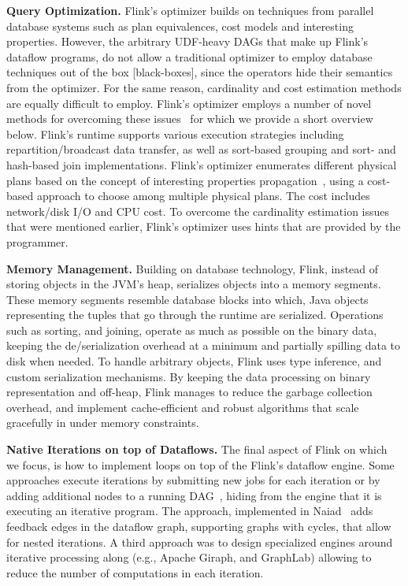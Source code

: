 \documentclass{sig-alternate}
\begin{document}
\textbf{Query Optimization.} Flink's optimizer builds on techniques from parallel database systems such as plan equivalences, cost models and interesting properties. However, the arbitrary UDF-heavy DAGs that make up Flink's dataflow programs, do not allow a traditional optimizer to employ database techniques out of the box [black-boxes], since the operators hide their semantics from the optimizer. For the same reason, cardinality and cost estimation methods are equally difficult to employ. Flink's optimizer employs a number of novel methods for overcoming these issues~\cite{blackBoxes, stratosphere, DBLP:journals/pvldb/EwenTKM12} for which we provide a short overview below. Flink's runtime supports various execution strategies including repartition/broadcast data transfer, as well as sort-based grouping and sort- and hash-based join implementations. Flink's optimizer enumerates different physical plans based on the concept of interesting properties propagation~\cite{scopeOptimizer}, using a cost-based approach to choose among multiple physical plans. The cost includes network/disk I/O and CPU cost. To overcome the cardinality estimation issues that were mentioned earlier, Flink's optimizer uses hints that are provided by the programmer.

\textbf{Memory Management.} Building on database technology, Flink, instead of storing objects in the JVM's heap, serializes objects into a  memory segments. These memory segments resemble database blocks into which, Java objects representing the tuples that go through the runtime are serialized. Operations such as sorting, and joining, operate as much as possible on the binary data, keeping the de/serialization overhead at a minimum and partially spilling data to disk when needed. To handle arbitrary objects, Flink uses type inference, and  custom serialization mechanisms.  By keeping the data processing on binary representation and off-heap, Flink manages to reduce the garbage collection overhead, and implement cache-efficient and robust algorithms that scale gracefully in under memory constraints.

\textbf{Native Iterations on top of Dataflows.} The final aspect of Flink on which we focus, is how to implement loops on top of the Flink's dataflow engine. Some approaches execute iterations by submitting new jobs for each iteration or by adding additional nodes to a running DAG~\cite{DBLP:journals/pvldb/BuHBE10, DBLP:conf/hotcloud/ZahariaCFSS10}, hiding from  the engine that it is executing an iterative program. The approach, implemented in Naiad~\cite{murray2013naiad} adds feedback edges in the dataflow graph, supporting graphs with cycles, that  allow for nested iterations. A third approach was to design specialized engines around iterative processing along (e.g., Apache Giraph, and GraphLab) allowing to reduce the number of computations in each iteration.~\cite{low2012distributed}
\end{document}
